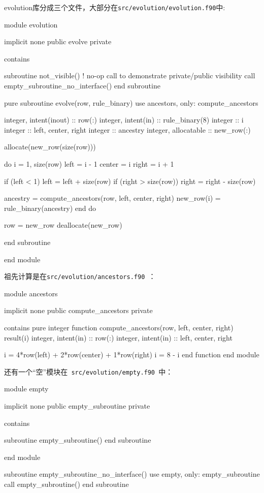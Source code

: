 evolution库分成三个文件，大部分在\texttt{src/evolution/evolution.f90}中:

\begin{codebox}[fortran]
module evolution

  implicit none
  public evolve
  private
  
contains

  subroutine not_visible()
    ! no-op call to demonstrate private/public visibility
    call empty_subroutine_no_interface()
  end subroutine
  
  pure subroutine evolve(row, rule_binary)
    use ancestors, only: compute_ancestors
    
    integer, intent(inout) :: row(:)
    integer, intent(in) :: rule_binary(8)
    integer :: i
    integer :: left, center, right
    integer :: ancestry
    integer, allocatable :: new_row(:)
    
    allocate(new_row(size(row)))
    
    do i = 1, size(row)
      left = i - 1
      center = i
      right = i + 1
      
      if (left < 1) left = left + size(row)
      if (right > size(row)) right = right - size(row)
      
      ancestry = compute_ancestors(row, left, center, right)
      new_row(i) = rule_binary(ancestry)
    end do
    
    row = new_row
    deallocate(new_row)
    
  end subroutine
  
end module
\end{codebox}

祖先计算是在\texttt{src/evolution/ancestors.f90 }：

\begin{codebox}[fortran]
module ancestors

  implicit none
  public compute_ancestors
  private
  
  contains
  pure integer function compute_ancestors(row, left, center, right) result(i)
    integer, intent(in) :: row(:)
    integer, intent(in) :: left, center, right
    
    i = 4*row(left) + 2*row(center) + 1*row(right)
    i = 8 - i
  end function
end module
\end{codebox}

还有一个“空”模块在\texttt{ src/evolution/empty.f90 }中：

\begin{codebox}[fortran]
module empty

  implicit none
  public empty_subroutine
  private
  
contains

  subroutine empty_subroutine()
  end subroutine
  
end module

subroutine 
empty_subroutine_no_interface()
  use empty, only: empty_subroutine
  call empty_subroutine()
end subroutine
\end{codebox}

